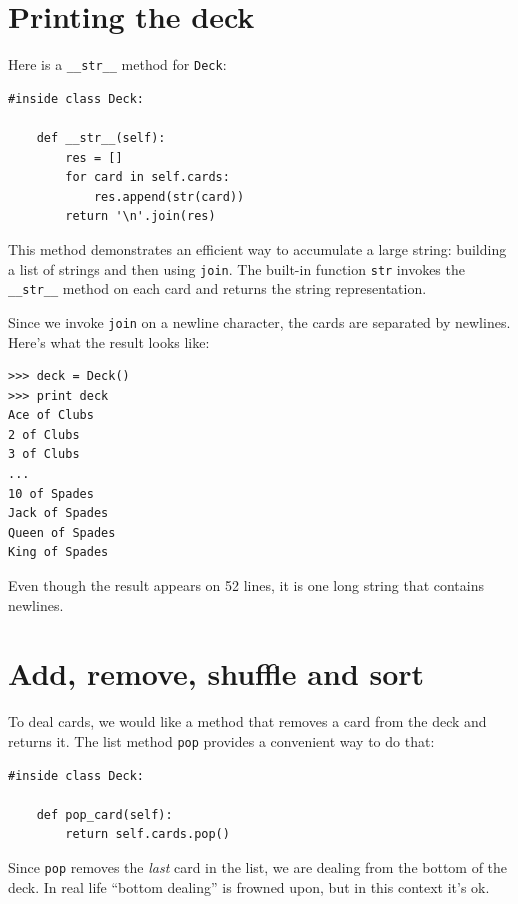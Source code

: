 \documentclass[12pt,a4paper,final,twoside,onecolumn,titlepage]{book}
\begin{document}
\section{Printing the deck}
\label{printdeck}

Here is a \verb"__str__" method for {\tt Deck}:

\begin{verbatim}
#inside class Deck:

    def __str__(self):
        res = []
        for card in self.cards:
            res.append(str(card))
        return '\n'.join(res)
\end{verbatim}
%
This method demonstrates an efficient way to accumulate a large
string: building a list of strings and then using {\tt join}.
The built-in function {\tt str} invokes the \verb"__str__"
method on each card and returns the string representation.

Since we invoke {\tt join} on a newline character, the cards
are separated by newlines.  Here's what the result looks like:

\begin{verbatim}
>>> deck = Deck()
>>> print deck
Ace of Clubs
2 of Clubs
3 of Clubs
...
10 of Spades
Jack of Spades
Queen of Spades
King of Spades
\end{verbatim}
%
Even though the result appears on 52 lines, it is
one long string that contains newlines.


\section{Add, remove, shuffle and sort}

To deal cards, we would like a method that
removes a card from the deck and returns it.
The list method {\tt pop} provides a convenient way to do that:

\begin{verbatim}
#inside class Deck:

    def pop_card(self):
        return self.cards.pop()
\end{verbatim}
%
Since {\tt pop} removes the {\em last} card in the list, we are
dealing from the bottom of the deck.  In real life ``bottom dealing'' is
frowned upon,
but in this context it's ok.
\end{document}
